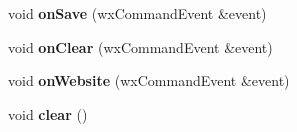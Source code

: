 \begin{DoxyCompactItemize}
\item 
\hypertarget{struct_the_frame_ad0c8b9f18646b6b9d0787241409bd0d1}{void {\bfseries on\-Save} (wx\-Command\-Event \&event)}\label{struct_the_frame_ad0c8b9f18646b6b9d0787241409bd0d1}

\item 
\hypertarget{struct_the_frame_af65b416093b66925a7884709b52fab77}{void {\bfseries on\-Clear} (wx\-Command\-Event \&event)}\label{struct_the_frame_af65b416093b66925a7884709b52fab77}

\item 
\hypertarget{struct_the_frame_aa6fc0c5ccb328dfa6dba6d251026a93c}{void {\bfseries on\-Website} (wx\-Command\-Event \&event)}\label{struct_the_frame_aa6fc0c5ccb328dfa6dba6d251026a93c}

\item 
\hypertarget{struct_the_frame_a8a83eff87c5c265f1c0bd195849808b9}{void {\bfseries clear} ()}\label{struct_the_frame_a8a83eff87c5c265f1c0bd195849808b9}

\end{DoxyCompactItemize}
